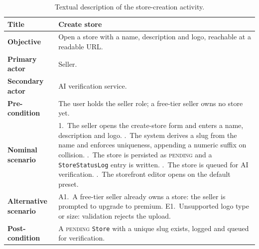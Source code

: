 \begin{table}[H]
  \centering
  \caption{Textual description of the store-creation activity.}
  \label{tab:act-create-store-desc}
  \renewcommand{\arraystretch}{1.3}
  \begin{tabularx}{\textwidth}{|>{\bfseries}p{3.2cm}|X|}
    \hline
    Title & Create store \\ \hline
    Objective & Open a store with a name, description and logo, reachable at a readable URL. \\ \hline
    Primary actor & Seller. \\ \hline
    Secondary actor & AI verification service. \\ \hline
    Pre-condition & The user holds the seller role; a free-tier seller owns no store yet. \\ \hline
    Nominal scenario & 1.~The seller opens the create-store form and enters a name, description and logo. \newline 2.~The system derives a slug from the name and enforces uniqueness, appending a numeric suffix on collision. \newline 3.~The store is persisted as \textsc{pending} and a \texttt{StoreStatusLog} entry is written. \newline 4.~The store is queued for AI verification. \newline 5.~The storefront editor opens on the default preset. \\ \hline
    Alternative scenario & A1.~A free-tier seller already owns a store: the seller is prompted to upgrade to premium. \newline E1.~Unsupported logo type or size: validation rejects the upload. \\ \hline
    Post-condition & A \textsc{pending} \texttt{Store} with a unique slug exists, logged and queued for verification. \\ \hline
  \end{tabularx}
\end{table}

